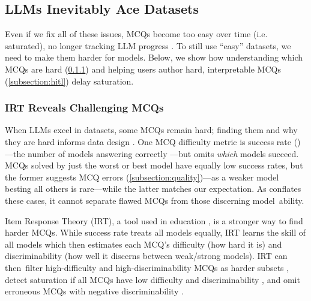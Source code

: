 \subsection{LLMs Inevitably Ace \mcqa Datasets} \label{subsection:saturation}

Even if we fix all of these issues, MCQs become too easy over
time (i.e. saturated), no longer tracking LLM progress
\cite{li2024crowdsourced}.
%
To still use ``easy'' \mcqa datasets, we need to
make them harder for models.
%
Below, we show how understanding which MCQs
are hard (\cref{subsection:irt}) and helping users author hard, interpretable MCQs (\cref{subsection:hitl}) delay saturation.




\subsubsection{IRT Reveals Challenging MCQs} \label{subsection:irt}

When LLMs excel in \mcqa datasets, some MCQs remain hard; finding
them and why they are hard informs data design
\cite{sugawara2018makes, Sugawara2022WhatMR}.
One MCQ difficulty metric is success rate (\success)---the number of models
answering correctly \cite{gupta2024improving}---but \success omits
\textit{which} models succeed.
MCQs solved by just the worst or best model have equally low success rates, but the former suggests MCQ errors (\cref{subsection:quality})---as a weaker model besting all others is rare---while the latter matches our expectation. 
As \success conflates these cases, it cannot separate flawed MCQs from those discerning model~ability.


Item Response Theory (IRT), a tool used in education \cite{lord2008statistical}, is a stronger way to find harder MCQs.
%
While success rate treats all models equally, IRT learns the skill of all models which then estimates each MCQ's difficulty (how hard it is) and discriminability (how well it discerns between weak/strong models).
IRT can then~filter high-difficulty and high-discriminability MCQs as harder subsets \cite{polo2024tinybenchmarks}, detect saturation if all MCQs have low difficulty and discriminability \cite{vania2021comparing}, and omit erroneous MCQs with negative discriminability \cite{rodriguez-etal-2021-evaluation}.

